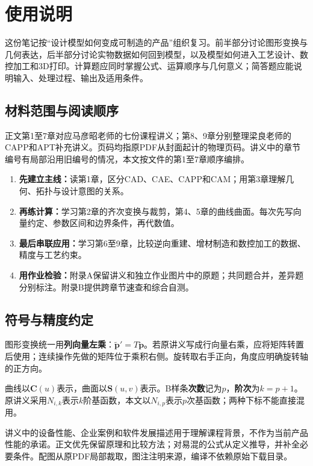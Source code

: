 \chapter*{使用说明}

这份笔记按“设计模型如何变成可制造的产品”组织复习。前半部分讨论图形变换与几何表达，后半部分讨论实物数据如何回到模型，以及模型如何进入工艺设计、数控加工和3D打印。计算题应同时掌握公式、运算顺序与几何意义；简答题应能说明输入、处理过程、输出及适用条件。

\section*{材料范围与阅读顺序}
正文第1至7章对应马彦昭老师的七份课程讲义；第8、9章分别整理梁良老师的CAPP和APT补充讲义。页码均指原PDF从封面起计的物理页码。讲义中的章节编号有局部沿用旧编号的情况，本文按文件的第1至7章顺序编排。

\begin{enumerate}
\item \textbf{先建立主线：}读第1章，区分CAD、CAE、CAPP和CAM；用第3章理解几何、拓扑与设计意图的关系。
\item \textbf{再练计算：}学习第2章的齐次变换与裁剪，第4、5章的曲线曲面。每次先写向量约定、参数区间和边界条件，再代数值。
\item \textbf{最后串联应用：}学习第6至9章，比较逆向重建、增材制造和数控加工的数据、精度与工艺约束。
\item \textbf{用作业检验：}附录A保留讲义和独立作业图片中的原题；共同题合并，差异题分别标注。附录B提供跨章节速查和综合自测。
\end{enumerate}


\section*{符号与精度约定}
图形变换统一用\textbf{列向量左乘}：$\widetilde{\boldsymbol p}'=T\widetilde{\boldsymbol p}$。若原讲义写成行向量右乘，应将矩阵转置后使用；连续操作先做的矩阵位于乘积右侧。旋转取右手正向，角度应明确旋转轴的正方向。

曲线以$\boldsymbol C(u)$表示，曲面以$\boldsymbol S(u,v)$表示。B样条\textbf{次数}记为$p$，\textbf{阶次}为$k=p+1$。原讲义采用$N_{i,k}$表示$k$阶基函数，本文以$N_{i,p}$表示$p$次基函数；两种下标不能直接混用。

讲义中的设备性能、企业案例和软件发展描述用于理解课程背景，不作为当前产品性能的承诺。正文优先保留原理和比较方法；对易混的公式从定义推导，并补全必要条件。配图从原PDF局部裁取，图注注明来源，编译不依赖原始下载目录。
